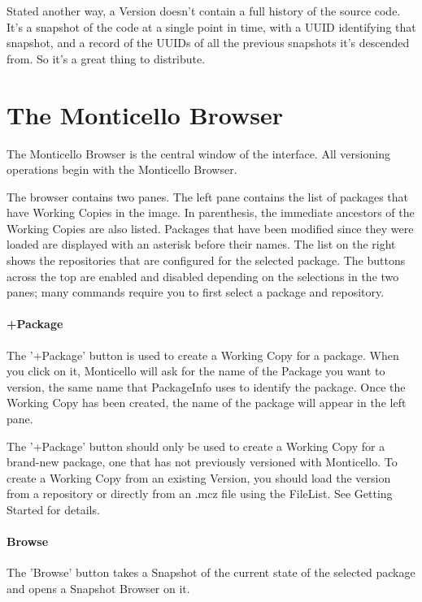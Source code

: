 \documentclass[a4paper,10pt,twoside]{book}
\begin{document}
Stated another way, a Version doesn't contain a full history of the source code. It's a snapshot of the code at a single point in time, with a UUID identifying that snapshot, and a record of the UUIDs of all the previous snapshots it's descended from. So it's a great thing to distribute.

\section{The Monticello Browser}

The Monticello Browser is the central window of the interface. All versioning operations begin with the Monticello Browser.

The browser contains two panes. The left pane contains the list of packages that have Working Copies in the image. In parenthesis, the immediate ancestors of the Working Copies are also listed. Packages that have been modified since they were loaded are displayed with an asterisk before their names. The list on the right shows the repositories that are configured for the selected package. The buttons across the top are enabled and disabled depending on the selections in the two panes; many commands require you to first select a package and repository.

\paragraph{+Package}

The '+Package' button is used to create a Working Copy for a package. When you click on it, Monticello will ask for the name of the Package you want to version, the same name that PackageInfo uses to identify the package. Once the Working Copy has been created, the name of the package will appear in the left pane.

The '+Package' button should only be used to create a Working Copy for a brand-new package, one that has not previously versioned with Monticello. To create a Working Copy from an existing Version, you should load the version from a repository or directly from an .mcz file using the FileList. See Getting Started for details.

\paragraph{Browse}

The 'Browse' button takes a Snapshot of the current state of the selected package and opens a Snapshot Browser on it.
\end{document}
